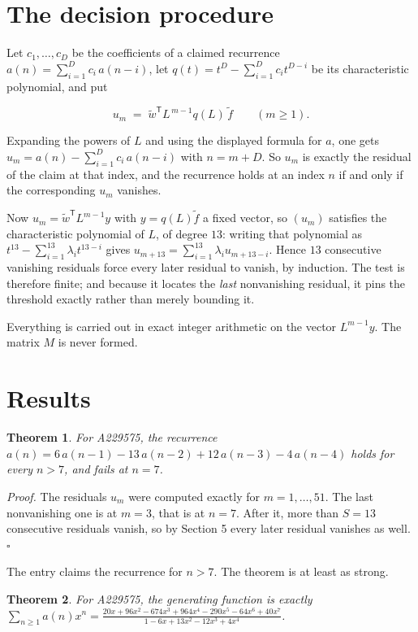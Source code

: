 \documentclass[11pt]{article}
\newtheorem{theorem}{Theorem}
\theoremstyle{definition}
\begin{document}
\section{The decision procedure}

Let $c_1,\dots,c_D$ be the coefficients of a claimed recurrence $a(n) = \sum_{i=1}^{D} c_i\,a(n-i)$, let $q(t) = t^{D} - \sum_{i=1}^{D} c_i t^{D-i}$ be its characteristic polynomial, and put

\[u_m \;=\; \tilde w^{\mathsf T} L^{\,m-1} q(L)\,\tilde f \qquad (m \ge 1).\]

Expanding the powers of $L$ and using the displayed formula for $a$, one gets $u_m = a(n) - \sum_{i=1}^{D} c_i\,a(n-i)$ with $n = m + D$. So $u_m$ is exactly the residual of the claim at that index, and the recurrence holds at an index $n$ if and only if the corresponding $u_m$ vanishes.

Now $u_m = \tilde w^{\mathsf T} L^{m-1} y$ with $y = q(L)\tilde f$ a fixed vector, so $(u_m)$ satisfies the characteristic polynomial of $L$, of degree $13$: writing that polynomial as $t^{13} - \sum_{i=1}^{13} \lambda_i t^{13-i}$ gives $u_{m+13} = \sum_{i=1}^{13} \lambda_i u_{m+13-i}$. Hence $13$ consecutive vanishing residuals force every later residual to vanish, by induction. The test is therefore finite; and because it locates the {\itshape last} nonvanishing residual, it pins the threshold exactly rather than merely bounding it.

Everything is carried out in exact integer arithmetic on the vector $L^{m-1}y$. The matrix $M$ is never formed.

\section{Results}

\begin{theorem} For A229575, the recurrence $a(n) = 6\,a(n-1) - 13\,a(n-2) + 12\,a(n-3) - 4\,a(n-4)$ holds for every $n > 7$, and fails at $n = 7$.\end{theorem}

{\itshape Proof.} The residuals $u_m$ were computed exactly for $m = 1,\dots,51$. The last nonvanishing one is at $m = 3$, that is at $n = 7$. After it, more than $S = 13$ consecutive residuals vanish, so by Section 5 every later residual vanishes as well. $\square$

The entry claims the recurrence for $n > 7$. The theorem is at least as strong.

\begin{theorem} For A229575, the generating function is exactly $\sum_{n\ge 1} a(n)x^n = \frac{20x + 96x^{2} - 674x^{3} + 964x^{4} - 290x^{5} - 64x^{6} + 40x^{7}}{1 - 6x + 13x^{2} - 12x^{3} + 4x^{4}}$.\end{theorem}
\end{document}
